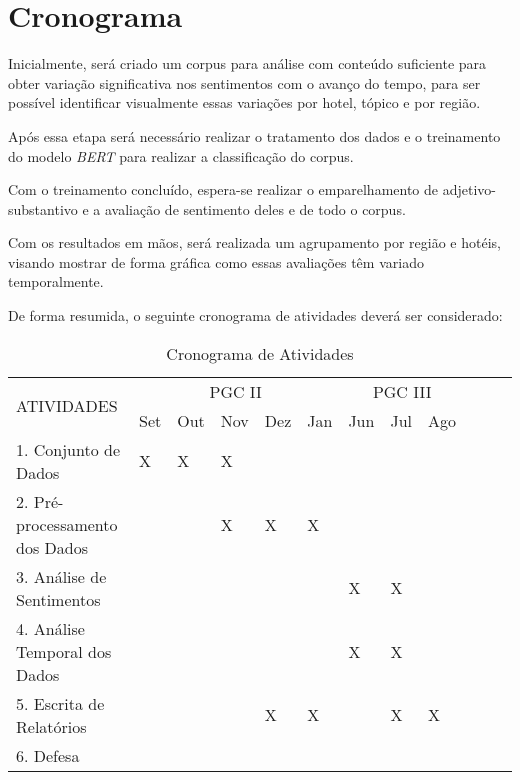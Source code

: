 \chapter{Cronograma}
\label{cap:cronograma}


Inicialmente, será criado um corpus para análise com conteúdo suficiente para obter variação significativa nos sentimentos com o avanço do tempo, para ser possível identificar visualmente essas variações por hotel, tópico e por região.

Após essa etapa será necessário realizar o tratamento dos dados e o treinamento do modelo \emph{BERT} para realizar a classificação do corpus.

Com o treinamento concluído, espera-se realizar o emparelhamento de adjetivo-substantivo e a avaliação de sentimento deles e de todo o corpus.

Com os resultados em mãos, será realizada um agrupamento por região e hotéis, visando mostrar de forma gráfica como essas avaliações têm variado temporalmente.

De forma resumida, o seguinte cronograma de atividades deverá ser considerado:

\begin{table}[H]
    \centering
    {\footnotesize
    \begin{tabular}{|p{6.1cm}|l|l|l|l|l|l|l|l|l|l|l|}
    \hline
    \multirow{2}{*}{ATIVIDADES} & \multicolumn{5}{c|}{PGC II} & \multicolumn{3}{c|}{PGC III}\\ \cline{2-9}
                                           &Set&Out&Nov&Dez&Jan&Jun&Jul&Ago \\ \hline
    1. Conjunto de Dados                   & X & X & X &   &   &   &   &    \\ \hline
    2. Pré-processamento dos Dados         &   &   & X & X & X &   &   &    \\ \hline
    3. Análise de Sentimentos              &   &   &   &   &   & X & X &    \\ \hline
    4. Análise Temporal dos Dados          &   &   &   &   &   & X & X &    \\ \hline
    5. Escrita de Relatórios               &   &   &   & X & X &   & X & X  \\ \hline
    6. Defesa                              &   &   &   &   &   &   &   &    \\ \hline
    \end{tabular}}
    \caption{Cronograma de Atividades}
    \label{tab:cronograma}
\end{table}
